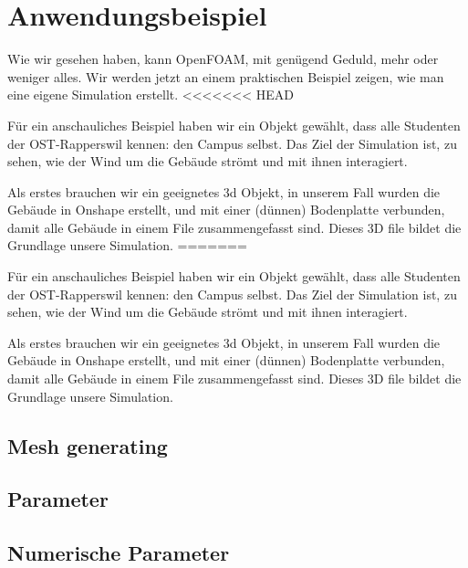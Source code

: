 %
%
%
%
\section{Anwendungsbeispiel
\label{openfoam:section:teil3}}
Wie wir gesehen haben, kann OpenFOAM, mit genügend Geduld, mehr oder weniger alles. 
Wir werden jetzt an einem praktischen Beispiel zeigen, wie man eine eigene Simulation erstellt.
<<<<<<< HEAD

Für ein anschauliches Beispiel haben wir ein Objekt gewählt, dass alle Studenten der OST-Rapperswil kennen: den Campus selbst.
Das Ziel der Simulation ist, zu sehen, wie der Wind um die Gebäude strömt und mit ihnen interagiert.

Als erstes brauchen wir ein geeignetes 3d Objekt, in unserem Fall wurden die Gebäude in Onshape erstellt, und mit einer (dünnen) Bodenplatte verbunden, damit alle Gebäude in einem File zusammengefasst sind.
Dieses 3D file bildet die Grundlage unsere Simulation.
=======

Für ein anschauliches Beispiel haben wir ein Objekt gewählt, dass alle Studenten der OST-Rapperswil kennen: den Campus selbst.
Das Ziel der Simulation ist, zu sehen, wie der Wind um die Gebäude strömt und mit ihnen interagiert.

Als erstes brauchen wir ein geeignetes 3d Objekt, in unserem Fall wurden die Gebäude in Onshape erstellt, und mit einer (dünnen) Bodenplatte verbunden, damit alle Gebäude in einem File zusammengefasst sind.
Dieses 3D file bildet die Grundlage unsere Simulation.


\subsection{Mesh generating\label{openfoam:section:Mesh generating}}
\subsection{Parameter\label{openfoam:section:Parameter}}
\subsection{Numerische Parameter\label{openfoam:section:Numerische Parameter}}

